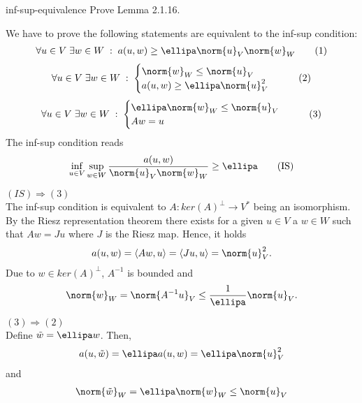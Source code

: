 \begin{Problem}{inf-sup-equivalence}
  Prove Lemma 2.1.16.
\begin{solution}
  We have to prove the following statements are equivalent to the inf-sup condition:
  \begin{align}
    \forall u\in V \;\exists w\in W \;:\; a(u,w) \ge \ellipa \norm{u}_V\norm{w}_W     \tag{1}
  \end{align}
  \begin{align}
   \begin{aligned}
    \forall u\in V \;\exists w\in W \;:\;
    \begin{cases}
      \norm{w}_W \le\norm{u}_V\\
      a(u,w) \ge \ellipa \norm{u}_V^2
    \end{cases}
   \end{aligned}
   \tag{2}
  \end{align}
  \begin{align}
   \begin{aligned}
    \forall u\in V \;\exists w\in W \;:\;
    \begin{cases}
      \ellipa \norm{w}_W \le \norm{u}_V\\
      Aw = u
      \end{cases}
  \end{aligned}
      \tag{3}
  \end{align}
  The inf-sup condition reads
  \begin{align}
   \inf_{u\in V} \sup_{w\in W} \frac{a(u,w)}{\norm{u}_V\norm{w}_W} \ge \ellipa \tag{IS}
  \end{align}

  $(IS)\Rightarrow(3)$\\
  The inf-sup condition is equivalent to $A: ker(A)^\perp\to V^*$ being an isomorphism.
  By the Riesz representation theorem there exists for a given $u\in V$ a $w\in W$ such that
  $Aw=J u$ where $J$ is the Riesz map. Hence, it holds
  \begin{align}
a(u,w)=\langle A w, u\rangle = \langle J u, u\rangle = \norm{u}_V^2.
  \end{align}
 Due to $w\in ker(A)^\perp$, $A^{-1}$ is bounded and
 \begin{align}
 \norm{w}_W=\norm{A^{-1}u}_V\leq \frac{1}{\ellipa}\norm{u}_V.
  \end{align}

  $(3)\Rightarrow(2)$ \\
  Define $\tilde{w}=\ellipa w$. Then,
  \begin{align}
a(u,\tilde{w})=\ellipa a(u,w) = \ellipa \norm{u}_V^2
  \end{align}
  and
  \begin{align}
\norm{\tilde{w}}_W=\ellipa \norm{w}_W\leq\norm{u}_V
  \end{align}


\end{solution}
\end{Problem}
